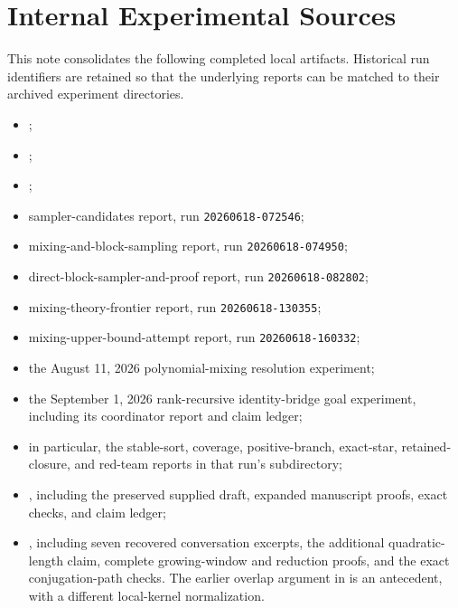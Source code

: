 \section*{Internal Experimental Sources}

This note consolidates the following completed local artifacts.  Historical
run identifiers are retained so that the underlying reports can be matched to
their archived experiment directories.
\begin{itemize}
\item {};
\item {};
\item {};
\item sampler-candidates report, run \texttt{20260618-072546};
\item mixing-and-block-sampling report, run \texttt{20260618-074950};
\item direct-block-sampler-and-proof report, run \texttt{20260618-082802};
\item mixing-theory-frontier report, run \texttt{20260618-130355};
\item mixing-upper-bound-attempt report, run \texttt{20260618-160332};
\item the August 11, 2026 polynomial-mixing resolution experiment;
\item the September 1, 2026 rank-recursive identity-bridge goal experiment,
  including its coordinator report and claim ledger;
\item in particular, the stable-sort, coverage, positive-branch, exact-star,
  retained-closure, and red-team reports in that run's
   subdirectory;
\item {}, including
  the preserved supplied draft, expanded manuscript proofs, exact checks,
  and claim ledger;
\item {}, including
  seven recovered conversation excerpts, the additional quadratic-length
  claim, complete growing-window and reduction proofs, and the exact
  conjugation-path checks.  The earlier overlap argument in
  is an antecedent, with a different local-kernel normalization.
\end{itemize}
